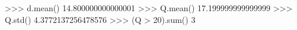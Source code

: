 
>>> d.mean()
14.800000000000001
>>> Q.mean()
17.199999999999999
>>> Q.std()
4.3772137256478576
>>> (Q > 20).sum()
3

